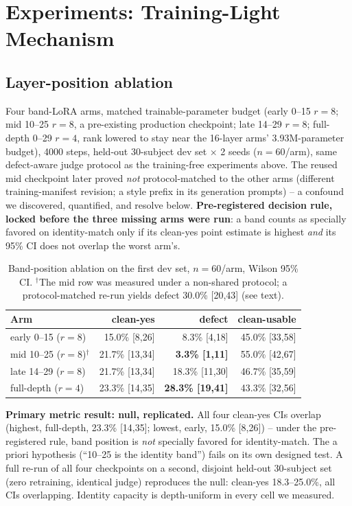 \section{Experiments: Training-Light Mechanism}\label{sec:results-tl}

\subsection{Layer-position ablation}\label{sec:bandablation}

Four band-LoRA arms, matched trainable-parameter budget (early 0--15
$r{=}8$; mid 10--25 $r{=}8$, a pre-existing production checkpoint; late
14--29 $r{=}8$; full-depth 0--29 $r{=}4$, rank lowered to stay near the
16-layer arms' 3.93M-parameter budget), 4000 steps, held-out 30-subject
dev set $\times$ 2 seeds ($n{=}60$/arm), same defect-aware judge protocol
as the training-free experiments above. The reused mid checkpoint later
proved \emph{not} protocol-matched to the other arms (different
training-manifest revision; a style prefix in its generation prompts) --
a confound we discovered, quantified, and resolve below. \textbf{Pre-registered decision rule,
locked before the three missing arms were run}: a band counts as
specially favored on identity-match only if its clean-yes point estimate
is highest \emph{and} its 95\% CI does not overlap the worst arm's.

\begin{table}[t]
\centering\small
\begin{tabular}{@{}lrrr@{}}
\toprule
Arm & clean-yes & defect & clean-usable \\
\midrule
early 0--15 ($r{=}8$) & 15.0\% [8,26] & 8.3\% [4,18] & 45.0\% [33,58] \\
mid 10--25 ($r{=}8$)$^\dagger$ & 21.7\% [13,34] & \textbf{3.3\% [1,11]} & 55.0\% [42,67] \\
late 14--29 ($r{=}8$) & 21.7\% [13,34] & 18.3\% [11,30] & 46.7\% [35,59] \\
full-depth ($r{=}4$) & 23.3\% [14,35] & \textbf{28.3\% [19,41]} & 43.3\% [32,56] \\
\bottomrule
\end{tabular}
\caption{Band-position ablation on the first dev set, $n{=}60$/arm,
Wilson 95\% CI. $^\dagger$The mid row was measured under a non-shared
protocol; a protocol-matched re-run yields defect 30.0\% [20,43] (see
text).}
\label{tab:bandablation}
\end{table}

\textbf{Primary metric result: null, replicated.} All four clean-yes
CIs overlap (highest, full-depth, 23.3\% [14,35]; lowest, early, 15.0\%
[8,26]) -- under the pre-registered rule, band position is \emph{not}
specially favored for identity-match. The a priori hypothesis (``10--25
is the identity band'') fails on its own designed test. A full re-run
of all four checkpoints on a second, disjoint held-out 30-subject set
(zero retraining, identical judge) reproduces the null: clean-yes
18.3--25.0\%, all CIs overlapping. Identity capacity is depth-uniform
in every cell we measured.

